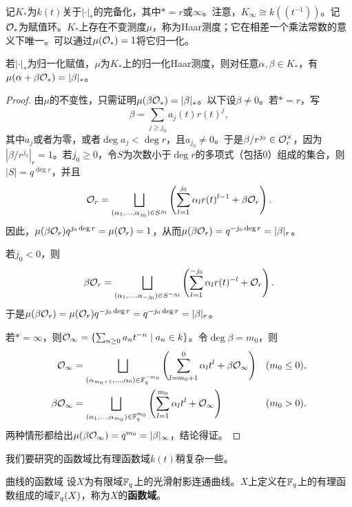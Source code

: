 记$K_*$为$k(t)$关于$|\cdot|_*$的完备化，其中$*=r$或$\infty$。注意，$K_\infty\cong k((t^{-1}))$。记$\mathcal O_*$为赋值环。$K_*$上存在不变测度$\mu$，称为Haar测度；它在相差一个乘法常数的意义下唯一。可以通过$\mu(\mathcal O_*)=1$将它归一化。
\begin{theorem}\label{L9S1O2}
若$|\cdot|_*$为归一化赋值，$\mu$为$K_*$上的归一化Haar测度，则对任意$\alpha,\beta\in K_*$，有$\mu(\alpha+\beta\mathcal O_*)=|\beta|_*$。
\end{theorem}
\begin{proof}
由$\mu$的不变性，只需证明$\mu(\beta\mathcal O_*)=|\beta|_*$。以下设$\beta\ne0$。若$*=r$，写
\[\beta=\sum_{j\geq j_0}a_j(t)r(t)^j,\]
其中$a_j$或者为零，或者$\deg a_j<\deg r$，且$a_{j_0}\ne0$。于是$\beta/r^{j_0}\in\mathcal O_r^\times$，因为$|\beta/r^{j_0}|_r=1$。若$j_0\geq0$，令$S$为次数小于$\deg r$的多项式（包括0）组成的集合，则$|S|=q^{\deg r}$，并且
\[\mathcal O_r=\bigsqcup_{(\alpha_1,\ldots,\alpha_{j_0})\in S^{j_0}}\left(\sum_{l=1}^{j_0}\alpha_l r(t)^{l-1}+\beta\mathcal O_r\right).\]
因此，$\mu(\beta\mathcal O_r)q^{j_0\deg r}=\mu(\mathcal O_r)=1$，从而$\mu(\beta\mathcal O_r)=q^{-j_0\deg r}=|\beta|_r$。

若$j_0<0$，则
\[\beta\mathcal O_r=\bigsqcup_{(\alpha_1,\ldots,\alpha_{-j_0})\in S^{-j_0}}\left(\sum_{l=1}^{-j_0}\alpha_l r(t)^{-l}+\mathcal O_r\right).\]
于是$\mu(\beta\mathcal O_r)=\mu(\mathcal O_r)q^{-j_0\deg r}=q^{-j_0\deg r}=|\beta|_r$。

若$*=\infty$，则$\mathcal O_\infty=\{\sum_{n\geq0}a_nt^{-n}\mid a_n\in k\}$。令$\deg\beta=m_0$，则
\[\begin{aligned}
\mathcal O_\infty&=\bigsqcup_{(\alpha_{m_0+1},\ldots,\alpha_0)\in\mathbb{F}_q^{-m_0}}\left(\sum_{l=m_0+1}^{0}\alpha_l t^l+\beta\mathcal O_\infty\right)&& (m_0\leq0),\\
\beta\mathcal O_\infty&=\bigsqcup_{(\alpha_1,\ldots,\alpha_{m_0})\in\mathbb{F}_q^{m_0}}\left(\sum_{l=1}^{m_0}\alpha_l t^l+\mathcal O_\infty\right)&& (m_0>0).
\end{aligned}\]
两种情形都给出$\mu(\beta\mathcal O_\infty)=q^{m_0}=|\beta|_\infty$，结论得证。
\end{proof}
我们要研究的函数域比有理函数域$k(t)$稍复杂一些。
\begin{definition}{曲线的函数域}\label{L9S1O3}
设$X$为有限域$\mathbb{F}_q$上的光滑射影连通曲线。$X$上定义在$\mathbb{F}_q$上的有理函数组成的域$\mathbb{F}_q(X)$，称为$X$的\textbf{函数域}。
\end{definition}
